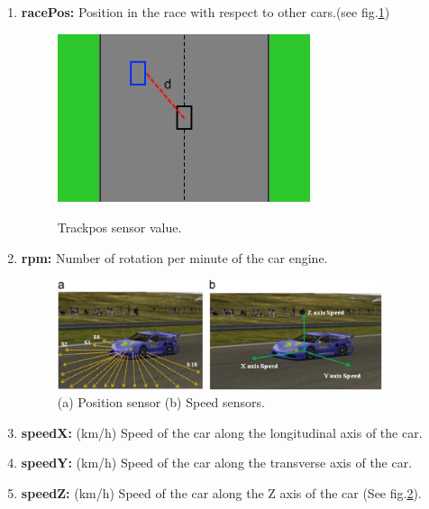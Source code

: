 \documentclass{llncs}
\begin{document}
\begin{enumerate}
	\item \textbf{racePos:} Position in the race with respect to other cars.(see fig.\ref{fig})
	\begin{figure}[h!]
		
		\centering
		\includegraphics[width=0.7\textwidth]{fig/opendist.png}
		\label{fig}
		\begin{minipage}{10cm}
			\centering
			\caption{\footnotesize Trackpos sensor value.}
		\end{minipage} 
	\end{figure}
	\item \textbf{rpm:}  Number of rotation per minute of the car engine.
	\begin{figure}[h!]
		
		\centering
		\includegraphics[width=0.9\textwidth]{fig/CARSEN.png}
		\begin{minipage}{10cm}
			\centering
			\caption{\footnotesize (a) Position sensor (b) Speed sensors.}
			\label{14}
		\end{minipage} 
	\end{figure}
	\newpage
	
	\item \textbf{speedX:} (km/h) Speed of the car along the longitudinal axis of the car.
	\item \textbf{speedY:} (km/h) Speed of the car along the transverse axis of the car.
	\item \textbf{speedZ:}  (km/h) Speed of the car along the Z axis of the car (See fig.\ref{14}).
	

\end{enumerate}
\end{document}
